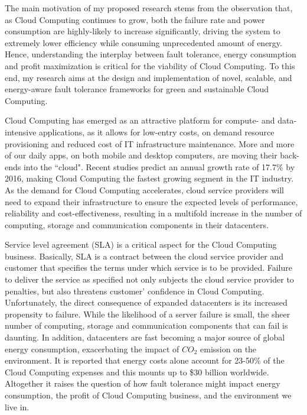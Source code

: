 The main motivation of my proposed research stems from the observation that, as Cloud Computing continues to grow, both the failure rate and power consumption are highly-likely to increase significantly, driving the system to extremely lower efficiency while consuming unprecedented amount of energy. Hence, understanding the interplay between fault tolerance, energy consumption and profit maximization is critical for the viability of Cloud Computing. To this end, my research aims at the design and implementation of novel, scalable, and energy-aware fault tolerance frameworks for green and sustainable Cloud Computing. 


Cloud Computing has emerged as an attractive platform for %
compute- and data-intensive applications, as it allows for low-entry costs, on demand resource provisioning and reduced cost of IT infrastructure maintenance. More and more of our daily apps, on both mobile and desktop computers, are moving their back-ends into the ``cloud". 
Recent studies predict an annual growth rate of 17.7\% by 2016, making Cloud Computing the fastest growing segment in the IT industry.
As the demand for Cloud Computing
accelerates, cloud service providers will 
need to expand their infrastructure to ensure the expected
levels of performance, reliability and cost-effectiveness, resulting
in a multifold increase in the number of computing, storage and
communication components in their datacenters. 



Service level agreement (SLA) is a critical aspect for the Cloud Computing business. Basically, SLA is a contract between the cloud service provider and customer that specifies the terms 
under which service is to be provided. %
Failure to deliver the service as specified 
not only subjects the cloud service provider to penalties, but also threatens customer' confidence in Cloud Computing. %
Unfortunately, the direct consequence of expanded datacenters is its increased propensity to
failure. While the likelihood of a server failure is small, the
sheer number of computing, storage and communication components that
can fail is daunting. %
In addition, datacenters are fast becoming a major source of global energy consumption, exacerbating the impact of $CO_2$ emission on the environment. It is reported that energy costs alone account
for 23-50\% of the Cloud Computing expenses and this mounts up to \$30 billion worldwide. Altogether it raises the question of how fault tolerance might impact energy consumption, the profit of Cloud Computing business, and the environment we live in. %


